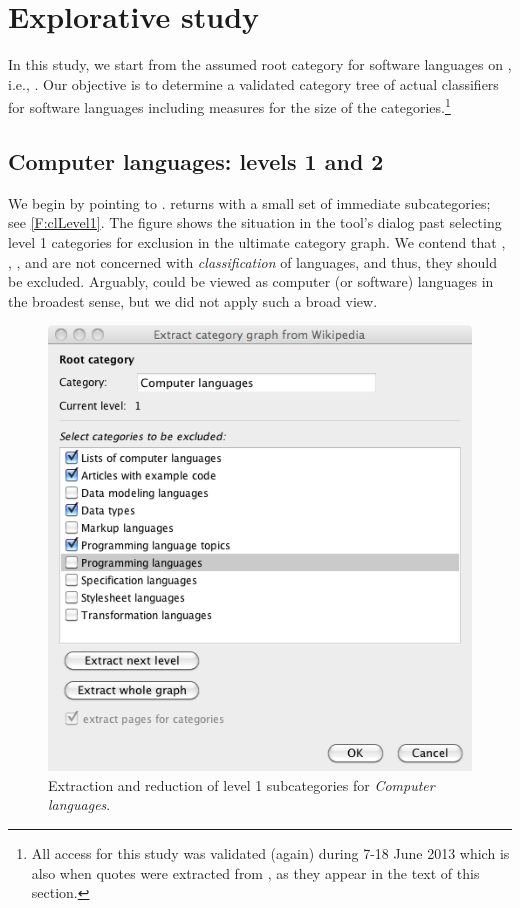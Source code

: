 
\section{Explorative study}
\label{S:study}

In this study, we start from the assumed root category for software languages on \Wikipedia, i.e., . Our objective is to determine a validated category tree of actual classifiers for software languages including measures for the size of the categories.\footnote{All \Wikipedia{} access for this study was validated (again) during 7-18 June 2013 which is also when quotes were extracted from \Wikipedia, as they appear in the text of this section.}


\subsection{Computer languages: levels 1 and 2}

We begin by pointing \WikiTax{} to . \WikiTax returns with a small set of immediate subcategories; see \autoref{F:clLevel1}. The figure shows the situation in the tool's dialog past selecting level 1 categories for exclusion in the ultimate category graph. We contend that , , , and  are not concerned with \emph{classification} of languages, and thus, they should be excluded. Arguably,  could be viewed as computer (or software) languages in the broadest sense, but we did not apply such a broad view.


\begin{figure}[t!]
\begin{center}
\includegraphics[width=.5\textwidth]{figures/clLevel1.png}
\end{center}
\vspace{-66\in}
\caption{Extraction and reduction of level 1 subcategories for \emph{Computer languages}.}
\label{F:clLevel1}
\vspace{-42\in}
\end{figure}

